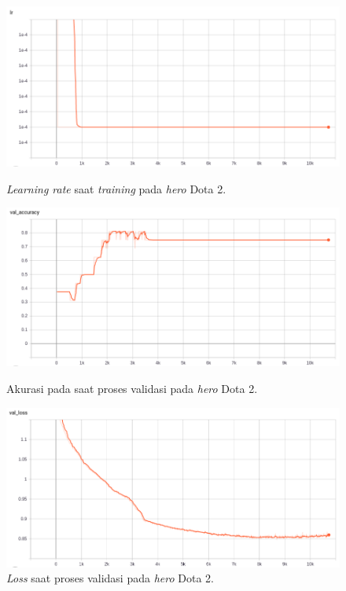\begin{figure} [!h] \centering
	\includegraphics[scale=0.4]{img/callback_lr_chap4.png}
	\caption{\textit{Learning rate} saat \textit{training} pada \textit{hero} Dota 2.}
	\label{fig:nn_dota2_lr_chap4}
	\vspace{4ex}

	\includegraphics[scale=0.4]{img/callback_val_acc_chap4.png}
	\caption{Akurasi pada saat proses validasi pada \textit{hero} Dota 2.}
	\label{fig:nn_dota2_val_acc_chap4}
	\vspace{4ex}

	\includegraphics[scale=0.4]{img/callback_val_loss_chap4.png}
	\caption{\textit{Loss} saat proses validasi pada \textit{hero} Dota 2.}
	\label{fig:nn_dota2_val_loss_chap4}
\end{figure}
\clearpage

